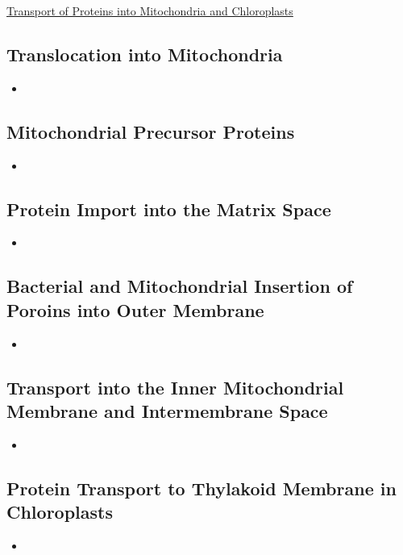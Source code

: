 \documentclass[12pt,letterpaper]{article}
\begin{document}
\hypertarget{12.3}{}
\begin{secbox}{\hyperlink{12}{Transport of Proteins into Mitochondria and Chloroplasts}}{
    \hypertarget{12.3.1}{\subsection*{Translocation into Mitochondria}}
    \begin{itemize}
        \item
    \end{itemize}

    \hypertarget{12.3.2}{\subsection*{Mitochondrial Precursor Proteins}}
    \begin{itemize}
        \item
    \end{itemize}

    \hypertarget{12.3.3}{\subsection*{Protein Import into the Matrix Space}}
    \begin{itemize}
        \item
    \end{itemize}

    \hypertarget{12.3.4}{\subsection*{Bacterial and Mitochondrial Insertion of Poroins into Outer Membrane}}
    \begin{itemize}
        \item
    \end{itemize}
    
    \hypertarget{12.3.5}{\subsection*{Transport into the Inner Mitochondrial Membrane and Intermembrane Space}}
    \begin{itemize}
        \item
    \end{itemize}
    
    \hypertarget{12.3.6}{\subsection*{Protein Transport to Thylakoid Membrane in Chloroplasts}}
    \begin{itemize}
        \item
    \end{itemize}
    
}
\end{secbox}
\end{document}

